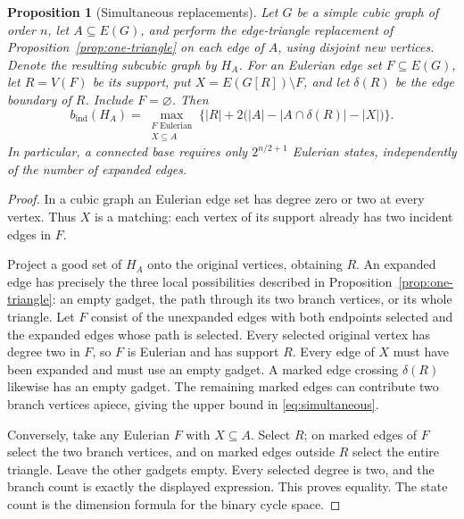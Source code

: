 \documentclass[11pt]{article}
\newtheorem{proposition}[theorem]{Proposition}
\newcommand{\bind}{b_{\mathrm{ind}}}
\begin{document}
\begin{proposition}[Simultaneous replacements]\label{prop:simultaneous}
Let $G$ be a simple cubic graph of order $n$, let $A\subseteq E(G)$,
and perform the edge-triangle replacement of
Proposition~\ref{prop:one-triangle} on each edge of $A$, using disjoint
new vertices. Denote the resulting subcubic graph by $H_A$.
For an Eulerian edge set $F\subseteq E(G)$, let $R=V(F)$ be its
support, put $X=E(G[R])\setminus F$, and let $\delta(R)$ be the
edge boundary of $R$. Include $F=\varnothing$. Then
\begin{equation}\label{eq:simultaneous}
 \bind(H_A)=
 \max_{\substack{F\text{ Eulerian}\\X\subseteq A}}
 \bigl\{|R|+2\bigl(|A|-|A\cap\delta(R)|-|X|\bigr)\bigr\}.
\end{equation}
In particular, a connected base requires only $2^{n/2+1}$ Eulerian
states, independently of the number of expanded edges.
\end{proposition}
\begin{proof}
In a cubic graph an Eulerian edge set has degree zero or two at
every vertex. Thus $X$ is a matching: each vertex of its support
already has two incident edges in $F$.

Project a good set of $H_A$ onto the original vertices, obtaining
$R$. An expanded edge has precisely the three local possibilities
described in Proposition~\ref{prop:one-triangle}: an empty gadget,
the path through its two branch vertices, or its whole triangle.
Let $F$ consist of the unexpanded edges with both endpoints selected
and the expanded edges whose path is selected. Every selected
original vertex has degree two in $F$, so $F$ is Eulerian and has
support $R$. Every edge of $X$ must have been expanded and must use
an empty gadget. A marked edge crossing $\delta(R)$ likewise has
an empty gadget. The remaining marked edges can contribute two
branch vertices apiece, giving the upper bound in
\eqref{eq:simultaneous}.

Conversely, take any Eulerian $F$ with $X\subseteq A$. Select $R$;
on marked edges of $F$ select the two branch vertices, and on marked
edges outside $R$ select the entire triangle. Leave the other
gadgets empty. Every selected degree is two, and the branch count
is exactly the displayed expression. This proves equality. The
state count is the dimension formula for the binary cycle space.
\end{proof}
\end{document}
